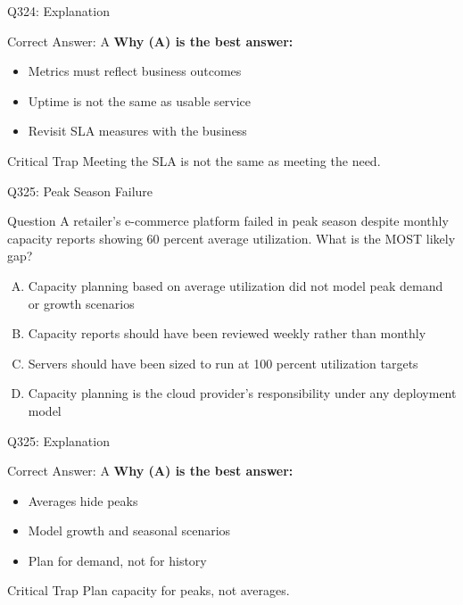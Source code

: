 \documentclass{beamer}
\begin{document}
	\begin{frame}{Q324: Explanation}
		\begin{block}{Correct Answer: A}
			\textbf{Why (A) is the best answer:}
			\begin{itemize}
				\item Metrics must reflect business outcomes
				\item Uptime is not the same as usable service
				\item Revisit SLA measures with the business
			\end{itemize}
		\end{block}
		\begin{alertblock}{Critical Trap}
			Meeting the SLA is not the same as meeting the need.
		\end{alertblock}
	\end{frame}
	
	\begin{frame}{Q325: Peak Season Failure}
		\begin{block}{Question}
			\small A retailer's e-commerce platform failed in peak season despite monthly capacity reports showing 60 percent average utilization. What is the MOST likely gap?
		\end{block}
		\begin{enumerate}[(A)]
			\footnotesize
			\item Capacity planning based on average utilization did not model peak demand or growth scenarios
			\item Capacity reports should have been reviewed weekly rather than monthly
			\item Servers should have been sized to run at 100 percent utilization targets
			\item Capacity planning is the cloud provider's responsibility under any deployment model
		\end{enumerate}
	\end{frame}
	
	\begin{frame}{Q325: Explanation}
		\begin{block}{Correct Answer: A}
			\textbf{Why (A) is the best answer:}
			\begin{itemize}
				\item Averages hide peaks
				\item Model growth and seasonal scenarios
				\item Plan for demand, not for history
			\end{itemize}
		\end{block}
		\begin{alertblock}{Critical Trap}
			Plan capacity for peaks, not averages.
		\end{alertblock}
	\end{frame}
	
\end{document}
